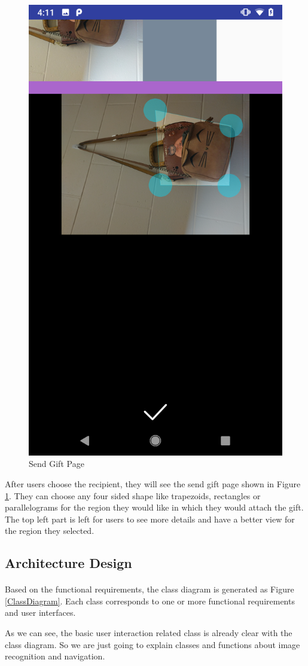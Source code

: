 \begin{figure}[htb]
\centering
\includegraphics[width=.5\textwidth]{section03/assets/SendGift.png}
\caption[Short Caption 2]{\label{SendGiftUI}Send Gift Page}
\end{figure}
\par After users choose the recipient, they will see the send gift page shown in Figure \ref{SendGiftUI}. They can choose any four sided shape like trapezoids, rectangles or parallelograms for the region they would like in which they would attach the gift. The top left part is left for users to see more details and have a better view for the region they selected.

\subsection{Architecture Design}
\paragraph{}Based on the functional requirements, the class diagram is generated as Figure \ref{ClassDiagram}. Each class corresponds to one or more functional requirements and user interfaces.
\par As we can see, the basic user interaction related class is already clear with the class diagram. So we are just going to explain classes and functions about image recognition and navigation.


